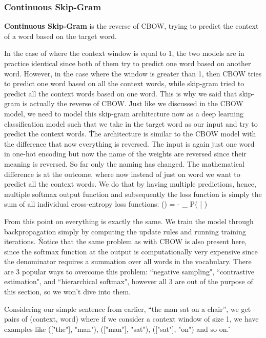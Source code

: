 \subsubsection{Continuous Skip-Gram}

\textbf{Continuous Skip-Gram} is the reverse of CBOW, trying to predict the context of a word based on the target word.
\ed

In the case of where the context window is equal to 1, the two models are in practice identical since both of them
try to predict one word based on another word. However, in the case where the window is greater than 1, then CBOW
tries to predict one word based on all the context words, while skip-gram tried to predict all the context words
based on one word. This is why we said that skip-gram is actually the reverse of CBOW\@. \v

Just like we discussed in the CBOW model, we need to model this skip-gram architecture now as a deep learning
classification model such that we take in the target word as our input and try to predict the context words. \v

The architecture is similar to the CBOW model with the difference that now everything is reversed. The input is
again just one word in one-hot encoding but now the name of the weights are reversed since their meaning is
reversed. So far only the naming has changed. The mathematical difference is at the outcome, where now instead of
just on word we want to predict all the context words. We do that by having multiple predictions, hence, multiple
softmax output function and subsequently the loss function is simply the sum of all individual cross-entropy loss
functions:
\bse
{}(\theta) = - \sum_{} \ln P( | )
\ese

From this point on everything is exactly the same. We train the model through backpropagation simply by computing the
update rules and running training iterations. \v

Notice that the same problem as with CBOW is also present here, since the softmax function at the output is
computationally very expensive since the denominator requires a summation over all words in the vocabulary. There
are 3 popular ways to overcome this problem: ``negative sampling", ``contrastive estimation", and ``hierarchical
softmax", however all 3 are out of the purpose of this section, so we won't dive into them.

\be
Considering our simple sentence from earlier, ``the man sat on a chair'', we get pairs of (context, word) where if we
consider a context window of size 1, we have examples like (["the"], "man"), (["man"], "sat"), (["sat"], "on") and so
on. \v


